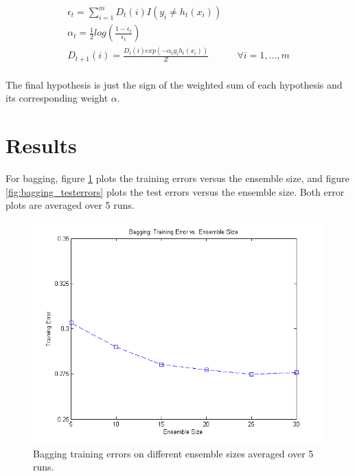 \documentclass[12pt]{article}
\begin{document}
\begin{align}
 \epsilon_t = \sum_{i=1}^{m} D_t(i) I(y_i \neq h_t(x_i)) \\
 \alpha_t = \frac{1}{2} log\left(\frac{1-\epsilon_t}{\epsilon_t}\right) \\
 D_{t+1}(i) = \frac{ D_{t}(i)exp(-\alpha_t y_i h_t(x_i)) }{Z} & & \forall i = 1,...,m \\
\end{align}

The final hypothesis is just the sign of the weighted sum of each hypothesis and its corresponding weight \(\alpha\).

\section{Results}
For bagging, figure \ref{fig:bagging_trainerrors} plots the training errors versus the ensemble size, and figure \ref{fig:bagging_testerrors} plots the test errors versus the ensemble size. Both error plots are averaged over 5 runs.

\begin{figure}[!t]
  \centering
  \includegraphics[scale=.6]{img/bagging_trainerrors.png}
  \caption{Bagging training errors on different ensemble sizes averaged over 5 runs.}
  \label{fig:bagging_trainerrors}
\end{figure}
\end{document}
